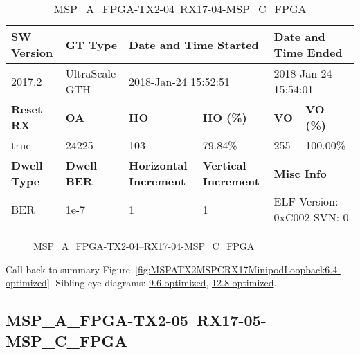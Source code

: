 \begin{table}[h]
\centering
\caption{MSP\_A\_FPGA-TX2-04--RX17-04-MSP\_C\_FPGA}
\label{tab:MSPAFPGATX204RX1704MSPCFPGA6.4-optimized}
\begin{tabular}{@{}|l|l|l|l|l|l|@{}}
\toprule
\textbf{SW Version}                & \textbf{GT Type}   & \multicolumn{2}{l|}{\textbf{Date and Time Started}}            & \multicolumn{2}{l|}{\textbf{Date and Time Ended}}        \\ \midrule
2017.2                       & UltraScale GTH          & \multicolumn{2}{l|}{2018-Jan-24 15:52:51}                   & \multicolumn{2}{l|}{2018-Jan-24 15:54:01}               \\ \midrule
\textbf{Reset RX}                  & \textbf{OA} & \textbf{HO}   & \textbf{HO (\%)} & \textbf{VO} & \textbf{VO (\%)} \\ \midrule
true & 24225        & 103          & 79.84\%        & 255        & 100.00\%       \\ \midrule
\textbf{Dwell Type}                & \textbf{Dwell BER} & \textbf{Horizontal Increment} & \textbf{Vertical Increment}    & \multicolumn{2}{l|}{\textbf{Misc Info}}                  \\ \midrule
BER                            & 1e-7        & 1        & 1           & \multicolumn{2}{l|}{ELF Version: 0xC002 SVN: 0}                         \\ \bottomrule
\end{tabular}
\end{table}

\begin{figure}[h]
\caption{MSP\_A\_FPGA-TX2-04--RX17-04-MSP\_C\_FPGA} \label{fig:MSPAFPGATX204RX1704MSPCFPGA6.4-optimized}
\end{figure}

Call back to summary Figure~\ref{fig:MSPATX2MSPCRX17MinipodLoopback6.4-optimized}.
Sibling eye diagrams: \hyperref[sec:MSPAFPGATX204RX1704MSPCFPGA9.6-optimized]{9.6-optimized}, \hyperref[sec:MSPAFPGATX204RX1704MSPCFPGA12.8-optimized]{12.8-optimized}.

\clearpage
\newpage


\subsection{MSP\_A\_FPGA-TX2-05--RX17-05-MSP\_C\_FPGA}\label{sec:MSPAFPGATX205RX1705MSPCFPGA6.4-optimized}

